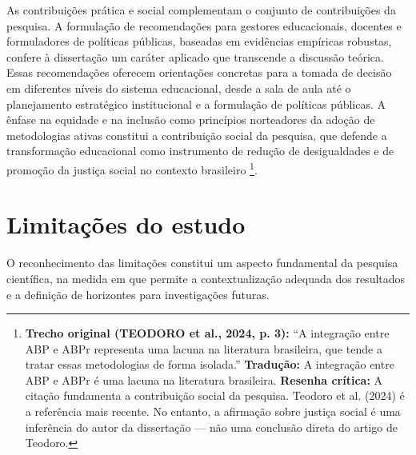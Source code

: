 As contribuições prática e social complementam o conjunto de contribuições da pesquisa. A formulação de recomendações para gestores educacionais, docentes e formuladores de políticas públicas, baseadas em evidências empíricas robustas, confere à dissertação um caráter aplicado que transcende a discussão teórica. Essas recomendações oferecem orientações concretas para a tomada de decisão em diferentes níveis do sistema educacional, desde a sala de aula até o planejamento estratégico institucional e a formulação de políticas públicas. A ênfase na equidade e na inclusão como princípios norteadores da adoção de metodologias ativas constitui a contribuição social da pesquisa, que defende a transformação educacional como instrumento de redução de desigualdades e de promoção da justiça social no contexto brasileiro \cite{TEODORO2024}\footnote{\textbf{Trecho original (TEODORO et al., 2024, p. 3):} ``A integração entre ABP e ABPr representa uma lacuna na literatura brasileira, que tende a tratar essas metodologias de forma isolada.'' \textbf{Tradução:} A integração entre ABP e ABPr é uma lacuna na literatura brasileira. \textbf{Resenha crítica:} A citação fundamenta a contribuição social da pesquisa. Teodoro et al. (2024) é a referência mais recente. No entanto, a afirmação sobre justiça social é uma inferência do autor da dissertação — não uma conclusão direta do artigo de Teodoro.}.

\section{Limitações do estudo}
\label{sec:limitacoes_conclusao}

O reconhecimento das limitações constitui um aspecto fundamental da pesquisa científica, na medida em que permite a contextualização adequada dos resultados e a definição de horizontes para investigações futuras.

